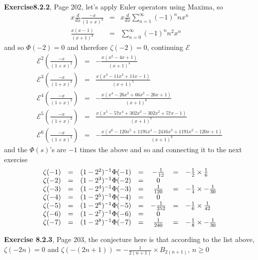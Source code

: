 \documentclass[aps,preprint,preprintnumbers,nofootinbib,showpacs,prd]{revtex4-1}
\newcommand{\nbea}{\begin{eqnarray*}}
\newcommand{\neea}{\end{eqnarray*}}
\begin{document}
{\bf Exercise8.2.2}, Page 202, let's apply Euler operators using Maxima, so
%
\nbea
x\frac{d}{dx}\frac{-x}{(1+x)^2} & = & x\frac{d}{dx}\sum_{n=1}^\infty (-1)^n n x^n \\
\frac{x(x-1)}{(x+1)^3} & = & \sum_{n=0}^\infty (-1)^{n} {n}^2 x^{n}
\neea
%
and so $\Phi(-2) = 0$ and therefore $\zeta(-2)=0$, continuing $\mathcal{E}$
%
\nbea
\mathcal{E}^2\left(\frac{-x}{(1+x)^2}\right) & = & -\frac{x(x^2-4x+1)}{(x+1)^4} \\
\mathcal{E}^3\left(\frac{-x}{(1+x)^2}\right) & = & \frac{x(x^3-11x^2+11x-1)}{(x+1)^5} \\
\mathcal{E}^4\left(\frac{-x}{(1+x)^2}\right) & = & -\frac{x(x^4-26x^3+66x^2-26x+1)}{(x+1)^6} \\
\mathcal{E}^5\left(\frac{-x}{(1+x)^2}\right) & = & \frac{x(x^5-57x^4+302x^3-302x^2+57x-1)}{(x+1)^7} \\
\mathcal{E}^6\left(\frac{-x}{(1+x)^2}\right) & = & -\frac{x(x^6-120x^5+1191x^4-2416x^3+1191x^2-120x+1)}{(x+1)^8}
\neea
%
and the $\Phi(s)$'s are $-1$ times the above and so and connecting it to the next exercise
%
\nbea
\begin{array}{r c l c c c l}
\zeta(-1) & = & (1-2^2)^{-1}\Phi(-1) & = & -\frac{1}{12} & = & -\frac{1}{2} \times \frac{1}{6}\\
\zeta(-2) & = & (1-2^3)^{-1}\Phi(-2) & = & 0 \\
\zeta(-3) & = & (1-2^4)^{-1}\Phi(-3) & = & \frac{1}{120}  & = & -\frac{1}{4} \times -\frac{1}{30}\\
\zeta(-4) & = & (1-2^5)^{-1}\Phi(-4) & = & 0 \\
\zeta(-5) & = & (1-2^6)^{-1}\Phi(-5) & = & -\frac{1}{252} & = & -\frac{1}{6} \times \frac{1}{42}\\
\zeta(-6) & = & (1-2^7)^{-1}\Phi(-6) & = & 0 \\
\zeta(-7) & = & (1-2^8)^{-1}\Phi(-7) & = & \frac{1}{240} & = & -\frac{1}{8} \times-\frac{1}{30}
\end{array}
\neea
%

{\bf Exercise 8.2.3}, Page 203, the conjecture here is that according to the list above, $\zeta(-2n)=0$ and $\zeta(-(2n+1)) = -\frac{1}{2(n+1)}\times B_{2(n+1)}$, $n\ge0$
\end{document}

